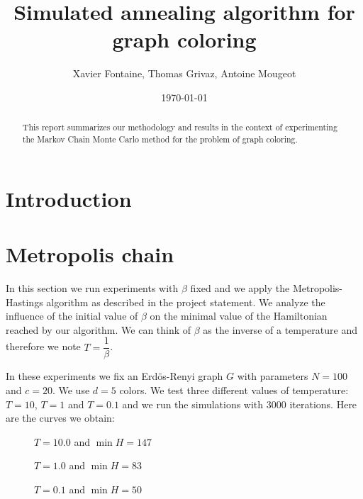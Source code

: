 \documentclass[a4paper]{article}
\title{Simulated annealing algorithm for graph coloring}
\author{Xavier Fontaine, Thomas Grivaz, Antoine Mougeot}
\date{\today}
\begin{document}
\maketitle

\begin{abstract}
This report summarizes our methodology and results in the context of experimenting the Markov Chain Monte Carlo method for the problem of graph coloring.
\end{abstract}

\section{Introduction}
\label{sec:introduction}

\section{Metropolis chain}

In this section we run experiments with $\beta$ fixed and we apply the Metropolis-Hastings algorithm as described in the project statement. We analyze the influence of the initial value of $\beta$ on the minimal value of the Hamiltonian reached by our algorithm. We can think of $\beta$ as the inverse of a temperature and therefore we note $T=\dfrac{1}{\beta}$.

In these experiments we fix an Erdös-Renyi graph $G$ with parameters $N=100$ and $c=20$. We use $d=5$ colors. We test three different values of temperature: $T=10$, $T=1$ and $T=0.1$ and we run the simulations with $3000$ iterations. Here are the curves we obtain:

\begin{figure}[H]
 \begin{minipage}[b]{.3\linewidth}
  \centering{}
  \caption{$T=10.0$ and $\min H=147$ \label{fix10}}
 \end{minipage} \hfill
 \begin{minipage}[b]{.3\linewidth}
  \centering{}
  \caption{$T=1.0$ and $\min H=83$ \label{fix1}}
 \end{minipage} \hfill
 \begin{minipage}[b]{.3\linewidth}
  \centering{}
  \caption{$T=0.1$ and $\min H=50$ \label{fix01}}
 \end{minipage}
\end{figure}
\end{document}
